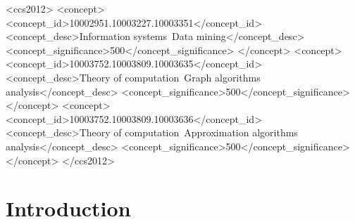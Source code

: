 \documentclass[sigconf]{acmart}
\begin{document}
\begin{CCSXML}
	<ccs2012>
	<concept>
	<concept_id>10002951.10003227.10003351</concept_id>
	<concept_desc>Information systems~Data mining</concept_desc>
	<concept_significance>500</concept_significance>
	</concept>
	<concept>
	<concept_id>10003752.10003809.10003635</concept_id>
	<concept_desc>Theory of computation~Graph algorithms analysis</concept_desc>
	<concept_significance>500</concept_significance>
	</concept>
	<concept>
	<concept_id>10003752.10003809.10003636</concept_id>
	<concept_desc>Theory of computation~Approximation algorithms analysis</concept_desc>
	<concept_significance>500</concept_significance>
	</concept>
	</ccs2012>
\end{CCSXML}




\maketitle



\section{Introduction}
\end{document}
